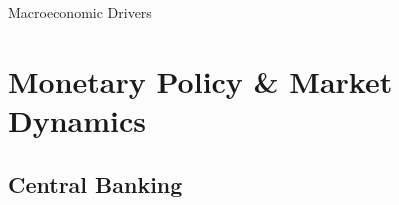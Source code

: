 \documentclass[10pt]{article}
\begin{document}
    \begin{core}{Macroeconomic Drivers}







    \end{core}

\section{Monetary Policy \& Market Dynamics}

  \subsection{Central Banking}
\end{document}
